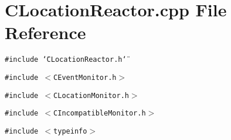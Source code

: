\section{CLocation\-Reactor.cpp File Reference}
\label{CLocationReactor_8cpp}
{\tt \#include \char`\"{}CLocation\-Reactor.h\char`\"{}}\par
{\tt \#include $<$CEvent\-Monitor.h$>$}\par
{\tt \#include $<$CLocation\-Monitor.h$>$}\par
{\tt \#include $<$CIncompatible\-Monitor.h$>$}\par
{\tt \#include $<$typeinfo$>$}\par
